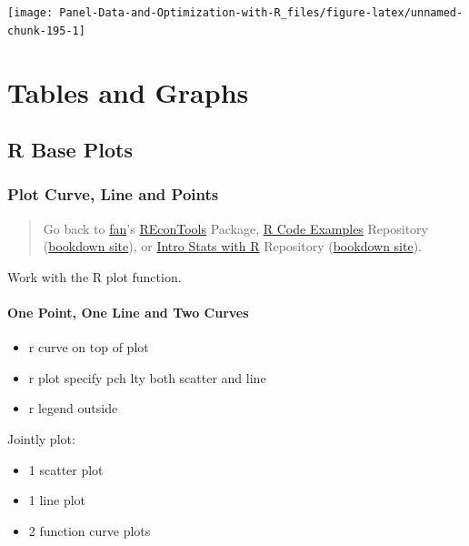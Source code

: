 \documentclass[
]{book}
\providecommand{\tightlist}{%
  \setlength{\itemsep}{0pt}\setlength{\parskip}{0pt}}
\begin{document}
\begin{center}\texttt{[image: Panel-Data-and-Optimization-with-R\_files/figure-latex/unnamed-chunk-195-1]} \end{center}

\hypertarget{tables-and-graphs}{%
\chapter{Tables and Graphs}\label{tables-and-graphs}}

\hypertarget{r-base-plots}{%
\section{R Base Plots}\label{r-base-plots}}

\hypertarget{plot-curve-line-and-points}{%
\subsection{Plot Curve, Line and Points}\label{plot-curve-line-and-points}}

\begin{quote}
Go back to \href{http://fanwangecon.github.io/}{fan}'s \href{https://fanwangecon.github.io/REconTools/}{REconTools} Package, \href{https://fanwangecon.github.io/R4Econ/}{R Code Examples} Repository (\href{https://fanwangecon.github.io/R4Econ/bookdown}{bookdown site}), or \href{https://fanwangecon.github.io/Stat4Econ/}{Intro Stats with R} Repository (\href{https://fanwangecon.github.io/Stat4Econ/bookdown}{bookdown site}).
\end{quote}

Work with the R plot function.

\hypertarget{one-point-one-line-and-two-curves}{%
\subsubsection{One Point, One Line and Two Curves}\label{one-point-one-line-and-two-curves}}

\begin{itemize}
\tightlist
\item
  r curve on top of plot
\item
  r plot specify pch lty both scatter and line
\item
  r legend outside
\end{itemize}

Jointly plot:

\begin{itemize}
\tightlist
\item
  1 scatter plot
\item
  1 line plot
\item
  2 function curve plots
\end{itemize}
\end{document}
